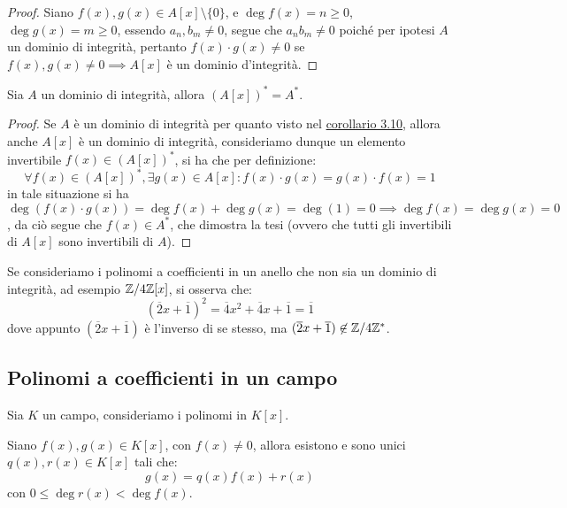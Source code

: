 \documentclass[11pt]{scrartcl}
\begin{document}
\begin{proof}
Siano $f(x),g(x) \in A[x] \setminus\{0\}$, e $\deg f(x) = n \geq 0$, $\deg g(x) = m \geq 0$, essendo $a_n, b_m \ne 0$, segue che $a_nb_m \ne 0$ poiché per ipotesi $A$ un dominio di integrità, pertanto $f(x) \cdot g(x) \ne 0$ se $f(x),g(x) \ne 0 \implies A[x]$ è un dominio d'integrità. 
\end{proof}

\begin{corollary}
Sia $A$ un dominio di integrità, allora $(A[x])^* = A^*$.
\end{corollary}

\begin{proof}
Se $A$ è un dominio di integrità per quanto visto nel \hyperref[p:3.10]{corollario 3.10}, allora anche $A[x]$ è un dominio di integrità, consideriamo dunque un elemento invertibile $f(x) \in (A[x])^*$, si ha che per definizione:
	\[ \forall f(x) \in (A[x])^*, \exists g(x) \in A[x] : f(x) \cdot g(x) = g(x) \cdot f(x) = 1
	\]
	in tale situazione si ha $\deg(f(x) \cdot g(x)) = \deg f(x) + \deg g(x) = \deg(1) = 0 \implies \deg f(x) = \deg g(x) = 0$, da ciò segue che $f(x) \in A^*$, che dimostra la tesi (ovvero che tutti gli invertibili di $A[x]$ sono invertibili di $A$).
\end{proof}

\begin{remark}
Se consideriamo i polinomi a coefficienti in un anello che non sia un dominio di integrità, ad esempio $\mathbb Z/4\mathbb Z[x]$, si osserva che:
	\[ (\overline 2x + \overline 1)^2 = \overline 4x^2 + \overline 4x + \overline 1 = \overline 1
	\]
dove appunto $(\overline 2x + \overline 1)$ è l'inverso di se stesso, ma $(\overline 2x + \overline 1) \not\in \mathbb Z/4\mathbb Z^*$.
\end{remark}
 
\newpage
\subsection{Polinomi a coefficienti in un campo}
 Sia $K$ un campo, consideriamo i polinomi in $K[x]$.
 \begin{theorem}
Siano $f(x), g(x) \in K[x]$, con $f(x) \ne 0$, allora esistono e sono unici $q(x), r(x) \in K[x]$ tali che:
	\[ g(x) = q(x)f(x) + r(x)
	\]
	con $0 \leq \deg r(x) < \deg f(x)$.
\end{theorem}
\end{document}
